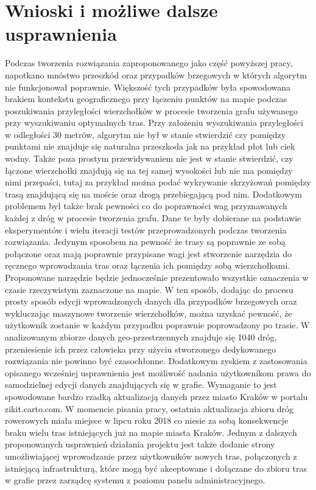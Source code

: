 \chapter{Wnioski i możliwe dalsze usprawnienia}
\label{cha:wnioski}

Podczas tworzenia rozwiązania zaproponowanego jako część powyższej pracy, napotkano mnóstwo przeszkód oraz przypadków brzegowych w których algorytm nie funkcjonował poprawnie. Większość tych przypadków była spowodowana brakiem kontekstu geograficznego przy łączeniu punktów na mapie podczas poszukiwania przyległości wierzchołków w procesie tworzenia grafu używanego przy wyszukiwaniu optymalnych tras. Przy założeniu wyszukiwania przyległości w odległości 30 metrów, algorytm nie był w stanie stwierdzić czy pomiędzy punktami nie znajduje się naturalna przeszkoda jak na przykład płot lub ciek wodny. Także poza prostym przewidywaniem nie jest w stanie stwierdzić, czy łączone wierzchołki znajdują się na tej samej wysokości lub nie ma pomiędzy nimi przepaści, tutaj za przykład można podać wykrywanie skrzyżowań pomiędzy trasą znajdującą się na moście oraz drogą przebiegającą pod nim. Dodatkowym problemem był także brak pewności co do poprawności wag przyznawanych każdej z dróg w procesie tworzenia grafu. Dane te były dobierane na podstawie eksperymentów i wielu iteracji testów przeprowadzonych podczas tworzenia rozwiązania. \newline
Jedynym sposobem na pewność że trasy są poprawnie ze sobą połączone oraz mają poprawnie przypisane wagi jest stworzenie narzędzia do ręcznego wprowadzania tras oraz łączenia ich pomiędzy sobą wierzchołkami. Proponowane narzędzie będzie jednocześnie prezentowało wszystkie oznaczenia w czasie rzeczywistym zaznaczone na mapie. W ten sposób, dodając do procesu prosty sposób edycji wprowadzonych danych dla przypadków brzegowych oraz wykluczając maszynowe tworzenie wierzchołków, można uzyskać pewność, że użytkownik zostanie w każdym przypadku poprawnie poprowadzony po trasie. W analizowanym zbiorze danych geo-przestrzennych znajduje się 1040 dróg, przeniesienie ich przez człowieka przy użyciu stworzonego dedykowanego rozwiązania nie powinno być czasochłonne. \newline
Dodatkowym zyskiem z zastosowania opisanego wcześniej usprawnienia jest możliwość nadania użytkownikom prawa do samodzielnej edycji danych znajdujących się w grafie. Wymaganie to jest spowodowane bardzo rzadką aktualizacją danych przez miasto Kraków w portalu zikit.carto.com. W momencie pisania pracy, ostatnia aktualizacja zbioru dróg rowerowych miała miejsce w lipcu roku 2018 co niesie za sobą konsekwencje braku wielu tras istniejących już na mapie miasta Kraków. Jednym z dalszych proponowanych usprawnień działania projektu jest także dodanie strony umożliwiającej wprowadzanie przez użytkowników nowych tras, połączonych z istniejącą infrastrukturą, które mogą być akceptowane i dołączane do zbioru tras w grafie przez zarządcę systemu z poziomu panelu administracyjnego. \newline
